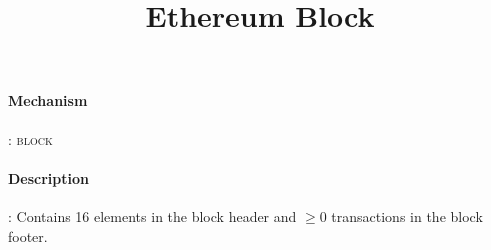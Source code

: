 \documentclass[9pt,a4paper,oneside]{scrartcl}
\author{}
\title{Ethereum Block}
\date{}
\begin{document}
\maketitle
\paragraph{Mechanism}: \textsc{block}
\paragraph{Description}: Contains 16 elements in the block header and $\geq 0$ transactions in the block footer. \\

\printbibliography
\end{document}
